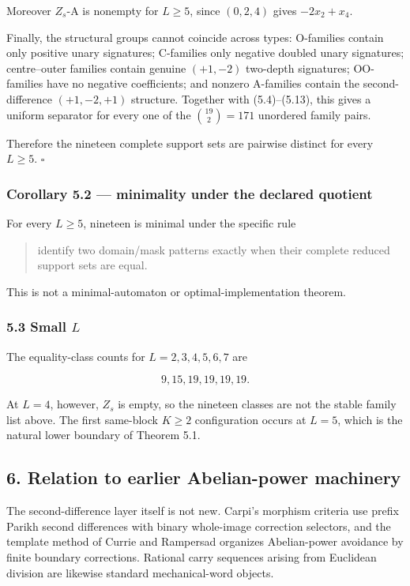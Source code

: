 \documentclass[
  british,
  a4paper,
  11pt]{article}
\newcounter{none} %
\begin{document}
Moreover \(Z_s\)-A is nonempty for \(L\ge5\), since \((0,2,4)\) gives
\(-2x_2+x_4\).

Finally, the structural groups cannot coincide across types: O-families
contain only positive unary signatures; C-families only negative doubled
unary signatures; centre--outer families contain genuine \((+1,-2)\)
two-depth signatures; OO-families have no negative coefficients; and
nonzero A-families contain the second-difference \((+1,-2,+1)\)
structure. Together with (5.4)--(5.13), this gives a uniform separator
for every one of the \(\binom{19}{2}=171\) unordered family pairs.

Therefore the nineteen complete support sets are pairwise distinct for
every \(L\ge5\). \(\square\)

\subsubsection{Corollary 5.2 --- minimality under the declared
quotient}\label{corollary-5.2-minimality-under-the-declared-quotient}

For every \(L\ge5\), nineteen is minimal under the specific rule

\begin{quote}
identify two domain/mask patterns exactly when their complete reduced
support sets are equal.
\end{quote}

This is not a minimal-automaton or optimal-implementation theorem.

\subsubsection{\texorpdfstring{5.3 Small
\(L\)}{5.3 Small L}}\label{small-l}

The equality-class counts for \(L=2,3,4,5,6,7\) are

\[
9,15,19,19,19,19.
\tag{5.14}
\]

At \(L=4\), however, \(Z_s\) is empty, so the nineteen classes are not
the stable family list above. The first same-block \(K\ge2\)
configuration occurs at \(L=5\), which is the natural lower boundary of
Theorem 5.1.

\subsection{6. Relation to earlier Abelian-power
machinery}\label{relation-to-earlier-abelian-power-machinery}

The second-difference layer itself is not new. Carpi's morphism criteria
use prefix Parikh second differences with binary whole-image correction
selectors, and the template method of Currie and Rampersad organizes
Abelian-power avoidance by finite boundary corrections. Rational carry
sequences arising from Euclidean division are likewise standard
mechanical-word objects.
\end{document}
